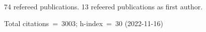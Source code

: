 74 refereed publications. 13 refeered publications as first author.

Total citations~=~3003; h-index~=~30 (2022-11-16)